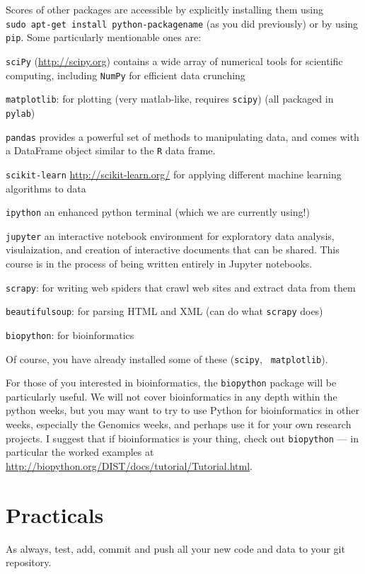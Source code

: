 Scores of other packages are accessible by explicitly installing them 
using \\{\tt sudo apt-get install python-packagename} (as you did 
previously) or by using {\tt pip}. Some particularly mentionable ones are:

\begin{compactitem}
		\item {\tt sciPy} (\url{http://scipy.org}) contains a wide array of numerical 
		tools  for scientific computing, including {\tt NumPy} for efficient data crunching
		\item {\tt matplotlib}: for plotting (very matlab-like, requires 
	 {\tt scipy}) (all packaged in {\tt pylab})
		\item {\tt pandas} provides a powerful set of methods to 
		manipulating data, and comes with a DataFrame object similar to the
		{\tt R} data frame.
		\item {\tt scikit-learn} \url{http://scikit-learn.org/} for applying 
		different machine learning algorithms to data
		\item {\tt ipython} an enhanced python terminal (which we are 
		currently using!) 
		\item {\tt jupyter} an interactive notebook environment for 
		exploratory data analysis, visulaization, and creation of interactive 
	 documents that can be shared. This course is in the process of being written entirely in Jupyter notebooks.
	 \item {\tt scrapy}: for writing web spiders that crawl web sites and 
	 extract data from them
	 \item {\tt beautifulsoup}: for parsing HTML and XML (can do what 
	 {\tt scrapy} does)
	 \item {\tt biopython}: for bioinformatics
\end{compactitem}
Of course, you have already installed some of these ({\tt scipy}, {\tt 
matplotlib}). 

For those of you interested in bioinformatics, the {\tt biopython} 
package will be particularly useful. We will not cover bioinformatics 
in any depth within the python weeks, but you may want to try 
to use Python for bioinformatics in other weeks, especially the 
Genomics weeks, and perhaps use it for your own research projects. I suggest that if bioinformatics is your thing, check out 
{\tt biopython} --- in particular the worked examples at 
\url{http://biopython.org/DIST/docs/tutorial/Tutorial.html}.


\section{Practicals}
As always, test, add, commit and push all your new code and data to 
your git repository. 

